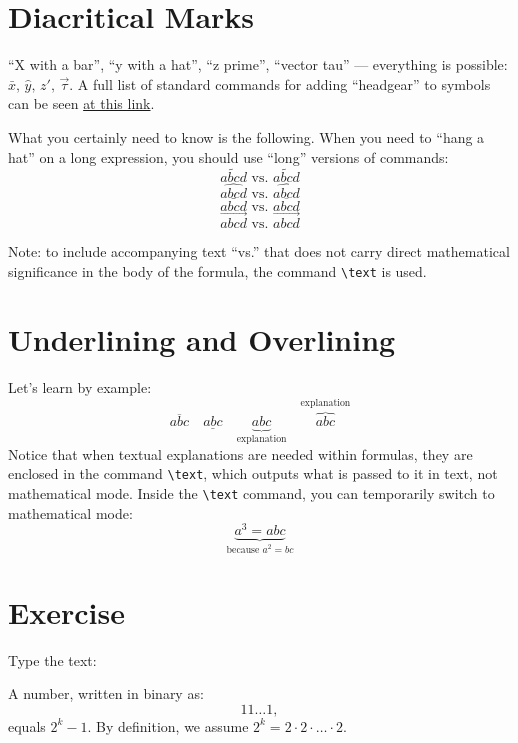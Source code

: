 \section{Diacritical Marks}
\par ``X with a bar'', ``y with a hat'', ``z prime'', ``vector tau'' --- everything is possible: \(\bar{x},\, \hat{y},\, z',\, \vec{\tau}\). A full list of standard commands for adding ``headgear'' to symbols can be seen \href{https://en.wikibooks.org/wiki/LaTeX/Special_Characters#Math_mode}{at this link}.
\par What you certainly need to know is the following. When you need to ``hang a hat'' on a long expression, you should use ``long'' versions of commands:\index{\hat=\widehat,\vec=\overrightarrow,\tilde=\widetilde}
\[\tilde{abcd} \text{ vs. } \widetilde{abcd}\]
\[\hat{abcd} \text{ vs. } \widehat{abcd}\]
\[\bar{abcd} \text{ vs. } \overline{abcd}\]
\[\vec{abcd} \text{ vs. } \overrightarrow{abcd}\]
\par Note: to include accompanying text ``vs.'' that does not carry direct mathematical significance in the body of the formula, the command \verb"\text" is used.

\section{Underlining and Overlining}
\par Let's learn by example: \[\overline{abc}\quad \underline{abc}\quad \underbrace{abc}_{\text{explanation}} \quad \overbrace{abc}^{\text{explanation}}\]
Notice that when textual explanations are needed within formulas, they are enclosed in the command \verb"\text", which outputs what is passed to it in text, not mathematical mode. Inside the \verb"\text" command, you can temporarily switch to mathematical mode:
\[ \underbrace{a^3=abc}_{\text{because \(a^2=bc\)}} \]

\section{Exercise}
\begin{staticpart}
Type the text: 
\end{staticpart}
\par A number, written in binary as: \[11\ldots 1,\] equals \(2^k-1\).
By definition, we assume \(2^k=2 \cdot 2 \cdot\ldots\cdot 2\).


